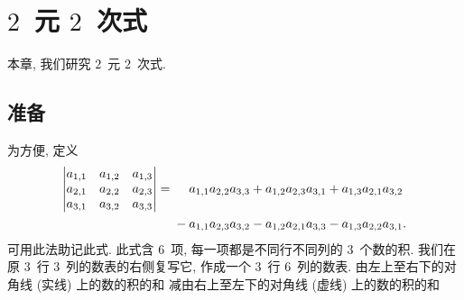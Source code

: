 \chapter{\texorpdfstring{\(2\)~元 \(2\)~次式}{2 元 2 次式}}

本章, 我们研究
\(2\)~元 \(2\)~次式.

\clearpage

\section{准备}

为方便, 定义
\begin{align*}
    \begin{vmatrix}
        a_{1,1} & a_{1,2} & a_{1,3} \\
        a_{2,1} & a_{2,2} & a_{2,3} \\
        a_{3,1} & a_{3,2} & a_{3,3} \\
    \end{vmatrix}
    = {} &
    \hphantom{{} + {}}
    a_{1,1} a_{2,2} a_{3,3}
    + a_{1,2} a_{2,3} a_{3,1}
    + a_{1,3} a_{2,1} a_{3,2}
    \\
         &
    - a_{1,1} a_{2,3} a_{3,2}
    - a_{1,2} a_{2,1} a_{3,3}
    - a_{1,3} a_{2,2} a_{3,1}.
\end{align*}
可用此法助记此式.
此式含 \(6\)~项,
每一项都是不同行不同列的 \(3\)~个数的积.
我们在原 \(3\)~行 \(3\)~列的数表的右侧复写它,
作成一个 \(3\)~行 \(6\)~列的数表.
由左上至右下的对角线 (实线) 上的数的积的和%
减由右上至左下的对角线 (虚线) 上的数的积的和%
